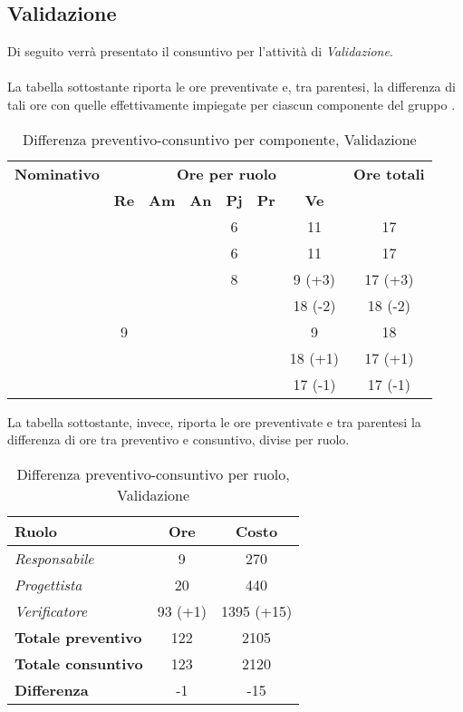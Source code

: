 \newpage
\subsection{Validazione}
Di seguito verrà presentato il consuntivo per l'attività di \textit{Validazione}.
\\\\
La tabella sottostante riporta le ore preventivate e, tra parentesi, la differenza di tali ore con quelle effettivamente impiegate per ciascun componente del gruppo \gruppo.

\begin{table}[H]
	\begin{center}
		\begin{tabular}{|c|c|c|c|c|c|c|c|}
			\hline
			\textbf{Nominativo} & \multicolumn{6}{c|}{\textbf{Ore per ruolo}} & \textbf{Ore totali} \\
			& \textbf{Re} & \textbf{Am} & \textbf{An} & \textbf{Pj} & \textbf{Pr} & \textbf{Ve} & \\
			\hline
			\FB			&			&			&			&	6		&			&	11			&	17				\\
			\hline
			\AF			&			&			&			&	6		&			&	11			& 	17				\\
			\hline		
			\GN			&			&			&			&	8		&			&	9 (+3)		&	17 (+3)			\\
			\hline
			\GR			&			&	 		&			&			&			& 	18 (-2)		&	18 (-2)			\\
			\hline
			\SM 		&	9		&			&			&			&			& 	9			&	18				\\
			\hline
			\MP 		& 			&			&			&			&			&	18 (+1)		&	17 (+1)			\\
			\hline
			\MV 		&			&			&			&			&			&	17	(-1)	& 	17 (-1)			\\
			\hline
		\end{tabular}
	\end{center}
	\caption{Differenza preventivo-consuntivo per componente, Validazione}
\end{table}


La tabella sottostante, invece, riporta le ore preventivate e  tra parentesi la differenza di ore tra preventivo e consuntivo, divise per ruolo.

\begin{table}[H]
	\begin{center}
		\begin{tabular}{|l|c|c|}
			\hline
			\textbf{Ruolo}	& \textbf{Ore} & \textbf{Costo} 		\\
			\hline
			\textit{Responsabile}		&	9		&	270			\\
			\hline
			\textit{Progettista}		&	20		&	440			\\
			\hline
			\textit{Verificatore}		&	93 (+1)	&	1395 (+15)	\\
			\hline
			\textbf{Totale preventivo}	&	122		& 	2105		\\
			\hline
			\textbf{Totale consuntivo}	&	123		&  	2120		\\
			\hline
			\textbf{Differenza} 		&	-1		&	-15			\\
			\hline
		\end{tabular}
	\end{center}
	\caption{Differenza preventivo-consuntivo per ruolo, Validazione}
\end{table}

